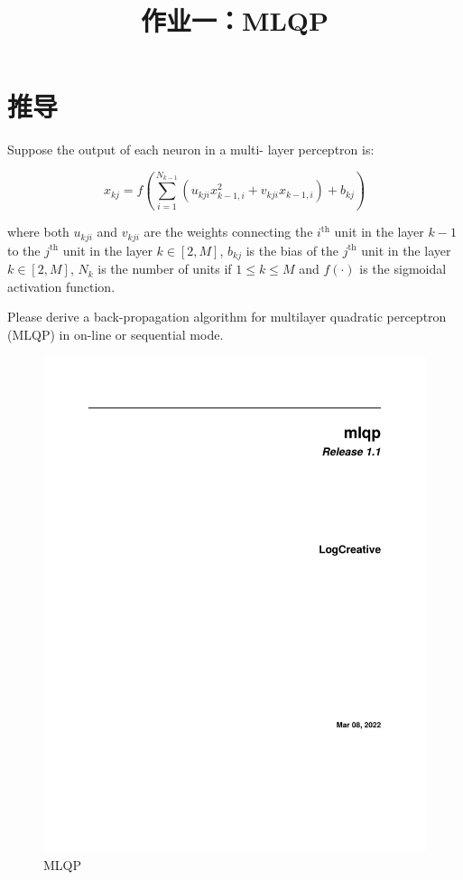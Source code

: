\endofdump
{}

    \title{作业一：MLQP}
    \maketitle

    \section{推导}
    \begin{problem}
        Suppose the output of each neuron in a multi-
layer perceptron is:

\begin{equation}\label{eq:def}
    x_{kj} = f\left(\sum_{i=1}^{N_{k-1}}(u_{kji}x_{k-1,i}^2+v_{kji}x_{k-1,i})+b_{kj}\right)
\end{equation}

where both $u_{kji}$ and $v_{kji}$ are the weights connecting the $i^\text{th}$ unit in the layer $k-1$ to the $j^\text{th}$ unit in the layer $k\in[2,M]$, $b_{kj}$ is 
the bias of the $j^\text{th}$ unit in the layer $k\in[2,M]$, $N_k$ is the number of 
units  if $1\leq k\leq M$ and $f(\cdot)$ is the sigmoidal activation 
function. 

Please derive a back-propagation algorithm for multilayer 
quadratic perceptron (MLQP) in on-line or sequential 
mode.
    \end{problem}

    \begin{figure}[h]
        \centering
        \includegraphics[height=0.25\textheight]{mlqp}
        \caption{MLQP}\label{fig:mlqp}
    \end{figure}

